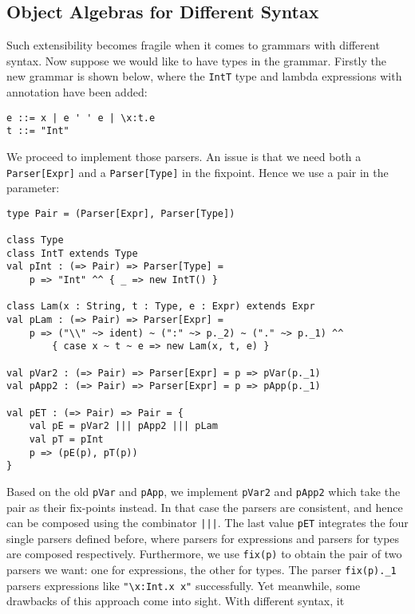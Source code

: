 \subsection{Object Algebras for Different Syntax}\label{subsec:differentsyntax}


Such extensibility becomes fragile when it comes to grammars with different syntax. Now suppose we would like to have types in the grammar. Firstly the new grammar is shown below, where the \lstinline{IntT} type and lambda expressions with annotation have been added:
\begin{lstlisting}
e ::= x | e ' ' e | \x:t.e
t ::= "Int"
\end{lstlisting}

We proceed to implement those parsers. An issue is that we need both a \lstinline{Parser[Expr]} and a \lstinline{Parser[Type]} in the fixpoint.
Hence we use a pair in the parameter:
\begin{lstlisting}
type Pair = (Parser[Expr], Parser[Type])

class Type
class IntT extends Type
val pInt : (=> Pair) => Parser[Type] =
    p => "Int" ^^ { _ => new IntT() }

class Lam(x : String, t : Type, e : Expr) extends Expr
val pLam : (=> Pair) => Parser[Expr] =
    p => ("\\" ~> ident) ~ (":" ~> p._2) ~ ("." ~> p._1) ^^
        { case x ~ t ~ e => new Lam(x, t, e) }

val pVar2 : (=> Pair) => Parser[Expr] = p => pVar(p._1)
val pApp2 : (=> Pair) => Parser[Expr] = p => pApp(p._1)

val pET : (=> Pair) => Pair = {
    val pE = pVar2 ||| pApp2 ||| pLam
    val pT = pInt
    p => (pE(p), pT(p))
}
\end{lstlisting}
Based on the old \lstinline{pVar} and \lstinline{pApp}, we implement \lstinline{pVar2} and \lstinline{pApp2} which take the pair as their fix-points instead.
In that case the parsers are consistent, and hence can be composed using the combinator \lstinline{|||}.
The last value \lstinline{pET} integrates the four single parsers defined before, where parsers for expressions and parsers for types are composed respectively. Furthermore, we use \lstinline{fix(p)} to obtain the pair of two parsers we want: one for expressions, the other for types. The parser \lstinline{fix(p)._1} parsers expressions like \lstinline{"\x:Int.x x"} successfully. Yet meanwhile, some drawbacks of this approach come into sight. With different syntax, it
